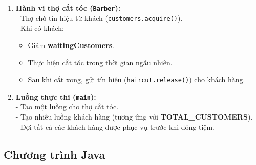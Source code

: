 \begin{enumerate}
    \item \textbf{Hành vi thợ cắt tóc (\texttt{Barber}):}\\
    - Thợ chờ tín hiệu từ khách (\texttt{customers.acquire()}).\\
    - Khi có khách:
    \begin{itemize}
        \item Giảm \textbf{waitingCustomers}.
        \item Thực hiện cắt tóc trong thời gian ngẫu nhiên.
        \item Sau khi cắt xong, gửi tín hiệu (\texttt{haircut.release()}) cho khách hàng.
    \end{itemize}

    \item \textbf{Luồng thực thi (\texttt{main}):}\\
    - Tạo một luồng cho thợ cắt tóc.\\
    - Tạo nhiều luồng khách hàng (tương ứng với \textbf{TOTAL\_CUSTOMERS}).\\
    - Đợi tất cả các khách hàng được phục vụ trước khi đóng tiệm.
\end{enumerate}

\subsection{Chương trình Java}


